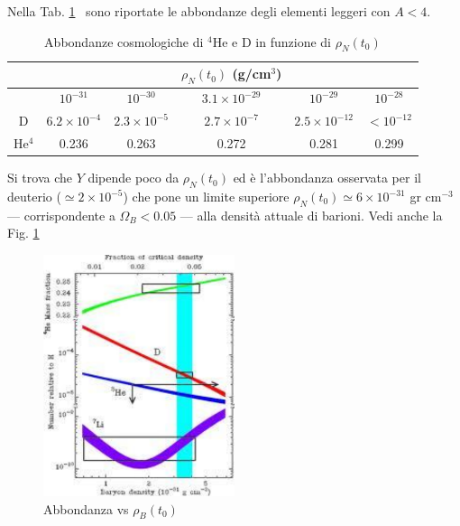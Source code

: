 Nella Tab. \ref{tab_abbondanze}~\parencite[555]{weinberg:gravitation} sono
riportate le abbondanze degli elementi leggeri con $A<4$.
\begin{table}
  \centering{}
  \caption{Abbondanze cosmologiche di $^4$He e D in funzione di $\rho_N(t_0)$}
  \label{tab_abbondanze}
  \begin{tabular}{cccccc}
    \toprule
           &                     &                     & $\rho_N(t_0)$ (g/cm$^{3}$) &                      &              \\
    \midrule
           & $10^{-31}         $ & $ 10^{-30}        $ & $3.1\times 10^{-29}$       & $ 10^{-29}         $ & $10^{-28}$   \\
    \midrule
    D      & $6.2\times 10^{-4}$ & $2.3\times 10^{-5}$ & $2.7\times 10^{-7} $       & $2.5\times 10^{-12}$ & $ <10^{-12}$ \\
    He$^4$ & 0.236               & 0.263               & 0.272                      & 0.281                & 0.299        \\
    \bottomrule
  \end{tabular}
\end{table}
Si trova che $Y$ dipende poco da $\rho_N(t_0)$ ed è l'abbondanza osservata per
il deuterio ($\simeq 2 \times 10^{-5}$) che pone un limite superiore
$\rho_N(t_0) \simeq 6 \times 10^{-31}$ gr cm$^{-3}$ --- corrispondente a
$\Omega_B <0.05$ --- alla densità attuale di barioni. Vedi anche la
Fig. \ref{fig:abbondanza}
\begin{figure}
  \centering{}
  \includegraphics[width=0.5\textwidth]{figure/Abundances.pdf}
  \caption{Abbondanza vs $\rho_B(t_0)$}
  \label{fig:abbondanza}
\end{figure}

